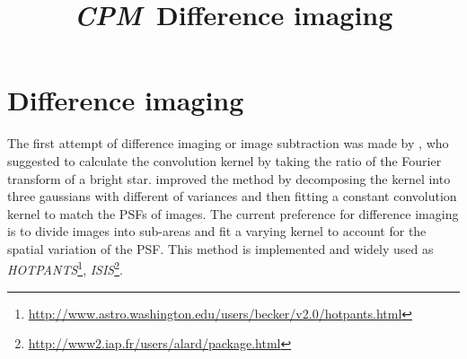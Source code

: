 \documentclass[12pt, preprint]{aastex}
\newcommand{\project}[1]{\textsl{#1}}
\newcommand{\cpm}{\project{CPM}}
\begin{document}
\title{\cpm\ Difference imaging}
\author{}

\section{Difference imaging}
The first attempt of difference imaging or image subtraction was made by \cite{imagesub1}, who suggested to calculate the convolution kernel by taking the ratio of the Fourier transform of a bright star.
\cite{alard} improved the method by decomposing the kernel into three gaussians with different of variances and then fitting a constant convolution kernel to match the PSFs of images.
The current preference for difference imaging \citep{varyingkernel} is to divide images into sub-areas and fit a varying kernel to account for the spatial variation of the PSF. This method is implemented and widely used as \project{HOTPANTS}\footnote{\url{http://www.astro.washington.edu/users/becker/v2.0/hotpants.html}}, \project{ISIS}\footnote{\url{http://www2.iap.fr/users/alard/package.html}}.


\clearpage

\clearpage
\end{document}
